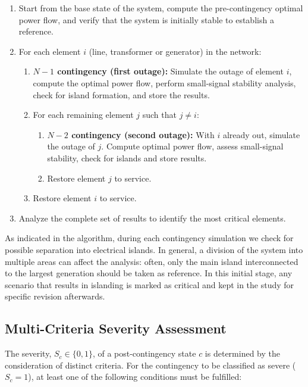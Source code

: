 \documentclass[journal]{IEEEtran}
\begin{document}
\begin{enumerate}
    \item Start from the base state of the system, compute the pre-contingency optimal power flow, and verify that the system is initially stable to establish a reference.
    
    \item For each element $i$ (line, transformer or generator) in the network:
    \begin{enumerate}
        \item \textbf{$N-1$ contingency (first outage):} Simulate the outage of element $i$, compute the optimal power flow, perform small-signal stability analysis, check for island formation, and store the results.

        \item For each remaining element $j$ such that $j \ne i$:
        \begin{enumerate}
            \item \textbf{$N-2$ contingency (second outage):} With $i$ already out, simulate the outage of $j$. Compute optimal power flow, assess small-signal stability, check for islands and store results.
            \item Restore element $j$ to service.
        \end{enumerate}

        \item Restore element $i$ to service.
    \end{enumerate}
    
    \item Analyze the complete set of results to identify the most critical elements.
\end{enumerate}

As indicated in the algorithm, during each contingency simulation we check for possible separation into electrical islands. In general, a division of the system into multiple areas can affect the analysis: often, only the main island interconnected to the largest generation should be taken as reference. In this initial stage, any scenario that results in islanding is marked as critical and kept in the study for specific revision afterwards.


\subsection{Multi-Criteria Severity Assessment}

\label{sec:severity}
The severity, $S_c \in \{0, 1\}$, of a post-contingency state $c$ is determined by the consideration of distinct criteria. For the contingency to be classified as severe ($S_c=1$), at least one of the following conditions must be fulfilled:
\end{document}
